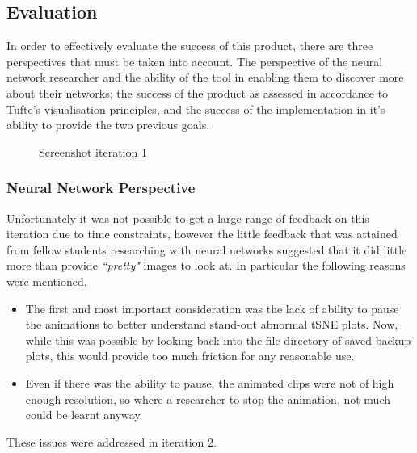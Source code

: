 \documentclass[a4paper,11pt,titlepage]{article}
\begin{document}
	
	\subsection{Evaluation}
	In order to effectively evaluate the success of this product, there are three perspectives that must be taken into account. The perspective of the neural network researcher and the ability of the tool in enabling them to discover more about their networks; the success of the product as assessed in accordance to Tufte's visualisation principles, and the success of the implementation in it's ability to provide the two previous goals.
	
	\begin{figure}[H]
    			\caption{Screenshot iteration 1}%
	\end{figure}		
	
	\subsubsection{Neural Network Perspective}
	Unfortunately it was not possible to get a large range of feedback on this iteration due to time constraints, however the little feedback that was attained from fellow students researching with neural networks suggested that it did little more than provide \textit{``pretty"} images to look at. In particular the following reasons were mentioned.
		\begin{itemize}
			\item The first and most important consideration was the lack of ability to pause the animations to better understand stand-out abnormal tSNE plots. Now, while this was possible by looking back into the file directory of saved backup plots, this would provide too much friction for any reasonable use.
		\item Even if there was the ability to pause, the animated clips were not of high enough resolution, so where a researcher to stop the animation, not much could be learnt anyway.
		\end{itemize}
		These issues were addressed in iteration 2.
		
\end{document}
